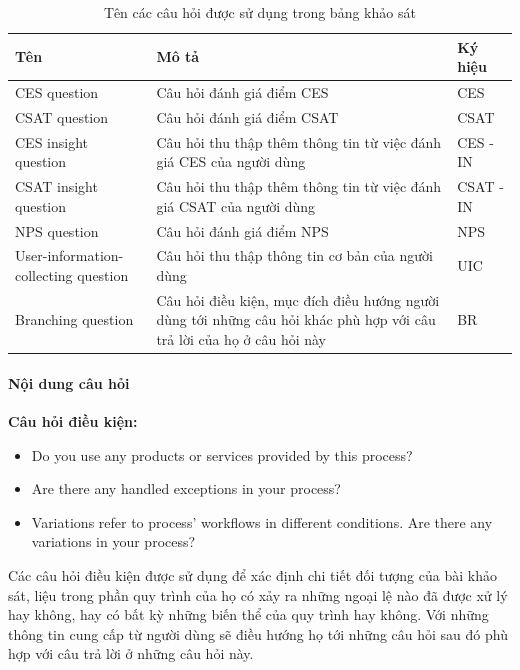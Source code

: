 \begin{center}
\begin{table}
    \begin{tabular}{|p{4cm} |p{8cm} |p{2cm}|}
        \hline
            Tên  & Mô tả & Ký hiệu \\ [0.5ex] 
        \hline
            CES question & 
            Câu hỏi đánh giá điểm CES & 
            CES \\
        \hline
            CSAT question & 
            Câu hỏi đánh giá điểm CSAT & 
            CSAT \\
        \hline
            CES insight question & 
            Câu hỏi thu thập thêm thông tin từ việc đánh giá CES của người dùng & 
            CES - IN \\
        \hline
            CSAT insight question & 
            Câu hỏi thu thập thêm thông tin từ việc đánh giá CSAT của người dùng & 
            CSAT - IN \\
        \hline
            NPS question & 
            Câu hỏi đánh giá điểm NPS & 
            NPS \\ 
        \hline
            User-information-collecting question & 
            Câu hỏi thu thập thông tin cơ bản của người dùng & 
            UIC \\
        \hline
            Branching question & 
            Câu hỏi điều kiện, mục đích điều hướng người dùng tới những câu hỏi khác phù hợp với câu trả lời của họ ở câu hỏi này & 
            BR \\ [1ex]
        \hline 
    \end{tabular}
    \caption{Tên các câu hỏi được sử dụng trong bảng khảo sát}
\end{table}
\end{center}

\paragraph{Nội dung câu hỏi}\mbox{}

\textbf{Câu hỏi điều kiện:}
\begin{itemize}
    \item Do you use any products or services provided by this process?
    \item Are there any handled exceptions in your process?
    \item Variations refer to process’ workflows in different conditions. Are there any variations in your process?
\end{itemize}
\par
Các câu hỏi điều kiện được sử dụng để xác định chi tiết đối tượng của bài khảo sát, liệu trong phần quy trình của họ có xảy ra những ngoại lệ nào đã được xử lý hay không, hay có bất kỳ những biến thể của quy trình hay không. Với những thông tin cung cấp từ người dùng sẽ điều hướng họ tới những câu hỏi sau đó phù hợp với câu trả lời ở những câu hỏi này.

